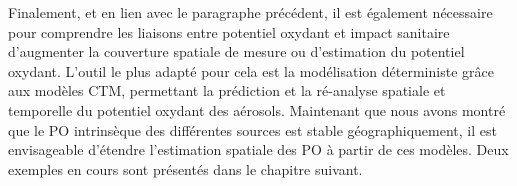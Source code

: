 Finalement, et en lien avec le paragraphe précédent, il est également nécessaire pour
comprendre les liaisons entre potentiel oxydant et impact sanitaire d'augmenter la
couverture spatiale de mesure ou d'estimation du potentiel oxydant. L'outil le plus adapté pour cela est
la modélisation déterministe grâce aux modèles CTM, permettant la prédiction et la
ré-analyse spatiale et temporelle du potentiel oxydant des aérosols. Maintenant que nous
avons montré que le PO intrinsèque des différentes sources est stable géographiquement,
il est envisageable d'étendre l'estimation spatiale des PO à partir de ces modèles. Deux
exemples en cours sont présentés dans le chapitre suivant.
